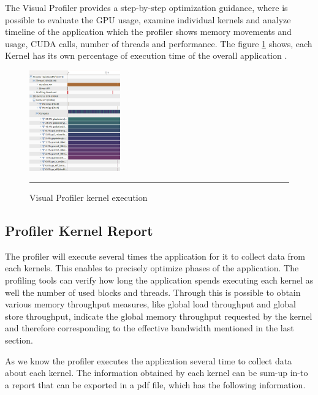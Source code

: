 The Visual Profiler provides a step-by-step optimization guidance, where is possible to evaluate the GPU usage, examine individual kernels and analyze timeline of the application which the profiler shows memory movements and usage, CUDA calls, number of threads and performance. The figure \ref{fig:visual01} shows, each Kernel has its own percentage of execution time of the overall application \cite{practices}.

\begin{figure}[htbp]
	\centering
		\includegraphics[width=0.35\textwidth]{Figures/visual01.png}
		\rule{35em}{0.5pt}
	\caption[Visual Profiler example]{Visual Profiler kernel execution}
	\label{fig:visual01}
\end{figure}

\subsection{Profiler Kernel Report}

The profiler will execute several times the application for it to collect data from each kernels. This enables to precisely optimize phases of the application\cite{example}. The profiling tools can verify how long the application spends executing each kernel as well the number of used blocks and threads. Through this is possible to obtain various memory throughput measures, like global load throughput and global store throughput, indicate the global memory throughput requested by the kernel and therefore corresponding to the effective bandwidth mentioned in the last section.

As we know the profiler executes the application several time to collect data about each kernel. The information obtained by each kernel can be sum-up in-to a report that can be exported in a pdf file, which has the following information.

